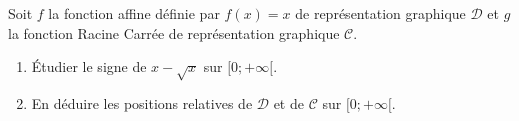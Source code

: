 
Soit $f$ la fonction affine définie par $f(x)=x$ de représentation graphique $\mathcal{D}$ et $g$ la fonction Racine Carrée de représentation graphique $\mathcal{C}$. 

\begin{enumerate}
\item Étudier le signe de $x -\sqrt x$ sur  $[0;+\infty[$.
\item En déduire les positions relatives de $\mathcal{D}$ et de $\mathcal{C}$ sur $[0;+\infty[$.
\end{enumerate}




 

